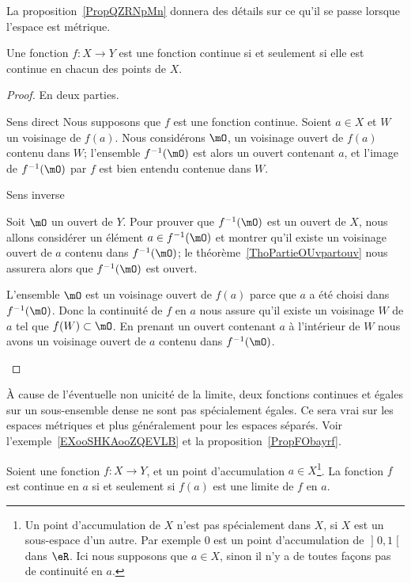 La proposition~\ref{PropQZRNpMn} donnera des détails sur ce qu'il se passe lorsque l'espace est métrique.

\begin{theorem} \label{ThoESCaraB}
    Une fonction \( f\colon X\to Y\) est une fonction continue si et seulement si elle est continue en chacun des points de \( X\).
\end{theorem}

\begin{proof}
    En deux parties.
    \begin{subproof}
    \item[Sens direct]
        Nous supposons que \( f\) est une fonction continue. Soient \( a\in X\) et \( W\) un voisinage de \( f(a)\). Nous considérons \( \mO\), un voisinage ouvert de \( f(a)\) contenu dans \( W\); l'ensemble \( f^{-1}(\mO)\) est alors un ouvert contenant \( a\), et l'image de \( f^{-1}(\mO)\) par \( f\) est bien entendu contenue dans \( W\).

    \item[Sens inverse]

        Soit \( \mO\) un ouvert de \( Y\). Pour prouver que \( f^{-1}(\mO)\) est un ouvert de \( X\), nous allons considérer un élément \( a\in f^{-1}(\mO)\) et montrer qu'il existe un voisinage ouvert de \( a\) contenu dans \( f^{-1}(\mO)\); le théorème~\ref{ThoPartieOUvpartouv} nous assurera alors que \( f^{-1}(\mO)\) est ouvert.

        L'ensemble \( \mO\) est un voisinage ouvert de \( f(a)\) parce que \( a\) a été choisi dans \( f^{-1}(\mO)\). Donc la continuité de \( f\) en \( a\) nous assure qu'il existe un voisinage \( W\) de \( a\) tel que \( f(W)\subset\mO\). En prenant un ouvert contenant \( a\) à l'intérieur de \( W\) nous avons un voisinage ouvert de \( a\) contenu dans \( f^{-1}(\mO)\).
    \end{subproof}
\end{proof}

\begin{remark}
    À cause de l'éventuelle non unicité de la limite, deux fonctions continues et égales sur un sous-ensemble dense ne sont pas spécialement égales. Ce sera vrai sur les espaces métriques et plus généralement pour les espaces séparés. Voir l'exemple~\ref{EXooSHKAooZQEVLB} et la proposition~\ref{PropFObayrf}.
\end{remark}

\begin{lemma}
Soient une fonction \( f\colon X\to Y\), et un point d'accumulation \( a\in X\)\footnote{Un point d'accumulation de \( X\) n'est pas spécialement dans \( X\), si \( X\) est un sous-espace d'un autre. Par exemple \( 0\) est un point d'accumulation de \( \mathopen] 0 , 1 \mathclose[\) dans \( \eR\). Ici nous supposons que \( a\in X\), sinon il n'y a de toutes façons pas de continuité en \( a\).}. La fonction \( f\) est continue en \( a\) si et seulement si \( f(a)\) est une limite de \( f\) en \( a\).
\end{lemma}


